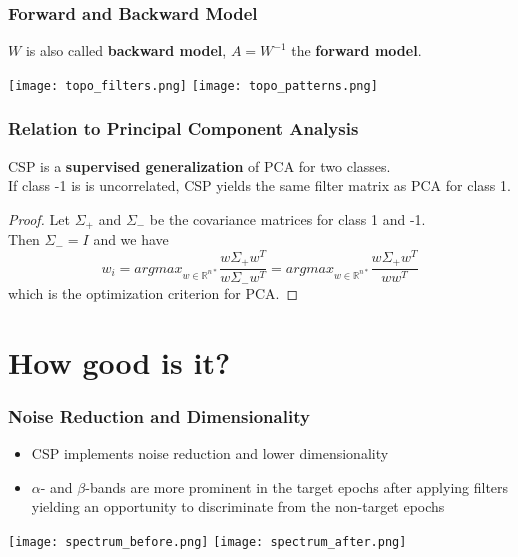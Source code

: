 \documentclass{beamer}
\begin{document}
\begin{frame}
	\frametitle{Forward and Backward Model}
	\begin{definition}
	$W$ is also called {\bf backward model},
	$A = W^{-1}$ the {\bf forward model}.
	\end{definition}
	
	\texttt{[image: topo\_filters.png]}
	\texttt{[image: topo\_patterns.png]}
\end{frame}

\begin{frame}
\frametitle{Relation to Principal Component Analysis}
	CSP is a {\bf supervised generalization} of PCA for two classes. \\
	If class -1 is is uncorrelated, CSP yields the same filter matrix as PCA for class 1.
	
	\begin{proof}
	Let $\Sigma_{+}$ and $\Sigma_{-}$ be the covariance matrices for class 1 and -1. \\
	Then $\Sigma_{-} = I$ and we have 
	\begin{equation}
	w_i = argmax_{w \in \mathds{R}^{n*}} \frac{w \Sigma_{+} w^T}{w \Sigma_{-} w^T} = argmax_{w \in \mathds{R}^{n*}} \frac{w \Sigma_{+} w^T}{w w^T}
	\end{equation}
	which is the optimization criterion for PCA.
	\end{proof}		
	
	
\end{frame}

\section{How good is it?}

\begin{frame}
\frametitle{Noise Reduction and Dimensionality}
	\begin{itemize}
	\item CSP implements noise reduction and lower dimensionality
	\item $\alpha$- and $\beta$-bands are more prominent in the {\color{blue}target epochs} after applying filters yielding an opportunity to discriminate from the {\color{red}non-target} epochs
	\end{itemize}
	\centering
	\texttt{[image: spectrum\_before.png]}
	\texttt{[image: spectrum\_after.png]}
\end{frame}
\end{document}
